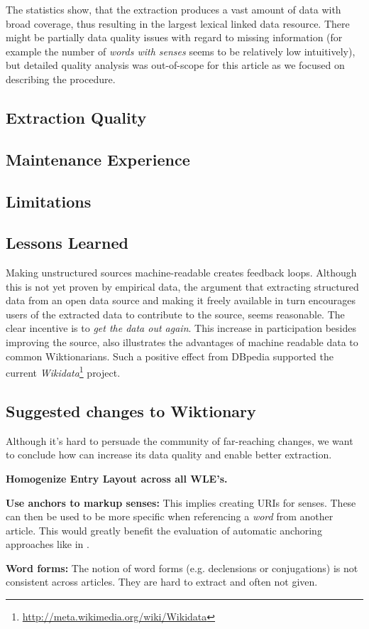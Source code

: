 The statistics show, that the extraction produces a vast amount of data with broad coverage, thus resulting in the largest lexical linked data resource. 
There might be partially data quality issues with regard to missing information (for example the number of \textit{words with senses} seems to be relatively low intuitively), but detailed quality analysis was out-of-scope for this article as we focused on describing the procedure. 

\subsection{Extraction Quality}

\subsection{Maintenance Experience}

\subsection{Limitations}

\subsection{Lessons Learned}
Making unstructured sources machine-readable creates feedback loops.
Although this is not yet proven by empirical data, the argument that extracting structured data from an open data source and making it freely available in turn encourages users of the extracted data to contribute to the source, seems reasonable.
The clear incentive is to \textit{get the data out again}.
This increase in participation besides improving the source, also illustrates the advantages of machine readable data to common Wiktionarians.
Such a positive effect from DBpedia supported the current \textit{Wikidata}\footnote{\url{http://meta.wikimedia.org/wiki/Wikidata}} project.

\subsection{Suggested changes to Wiktionary}
Although it's hard to persuade the community of far-reaching changes, we want to conclude how \wik can increase its data quality and enable better extraction.
\begin{compactitem}
	\item \textbf{Homogenize Entry Layout across all WLE's.}
	\item \textbf{Use anchors to markup senses:}
		This implies creating URIs for senses.
		These can then be used to be more specific when referencing a \textit{word} from another article. 
		This would greatly benefit the evaluation of automatic anchoring approaches like in \cite{meyer_2011b}.
	\item \textbf{Word forms:}
		The notion of word forms (e.g. declensions or conjugations) is not consistent across articles.
		They are hard to extract and often not given.
\end{compactitem}


\newpage
